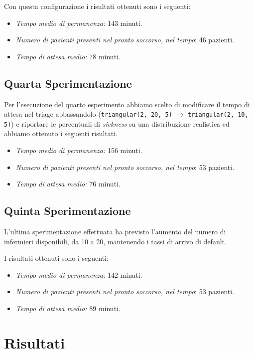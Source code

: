 Con questa configurazione i risultati ottenuti sono i seguenti: 
\begin{itemize}
    \item \textit{Tempo medio di permanenza:} 143 minuti.
    \item \textit{Numero di pazienti presenti nel pronto soccorso, nel tempo}: 46 pazienti.
    \item \textit{Tempo di attesa medio:} 78 minuti.
\end{itemize}


\subsection{Quarta Sperimentazione}
Per l'esecuzione del quarto esperimento abbiamo scelto di modificare il tempo di attesa nel triage abbassandolo (\texttt{triangular(2, 20, 5)} $\rightarrow$ \texttt{triangular(2, 10, 5)}) e riportare le percentuali di \textit{sickness} su una distribuzione realistica ed abbiamo ottenuto i seguenti risultati.

\begin{itemize}
    \item \textit{Tempo medio di permanenza:} 156 minuti.
    \item \textit{Numero di pazienti presenti nel pronto soccorso, nel tempo}: 53 pazienti.
    \item \textit{Tempo di attesa medio:} 76 minuti.
\end{itemize}

\subsection{Quinta Sperimentazione}
L'ultima sperimentazione effettuata ha previsto l'aumento del numero di infermieri disponibili, da 10 a 20, mantenendo i tassi di arrivo di default. 

I risultati ottenuti sono i seguenti: 
\begin{itemize}
    \item \textit{Tempo medio di permanenza:} 142 minuti.
    \item \textit{Numero di pazienti presenti nel pronto soccorso, nel tempo}: 53 pazienti.
    \item \textit{Tempo di attesa medio:} 89 minuti.
\end{itemize}

\section{Risultati}

